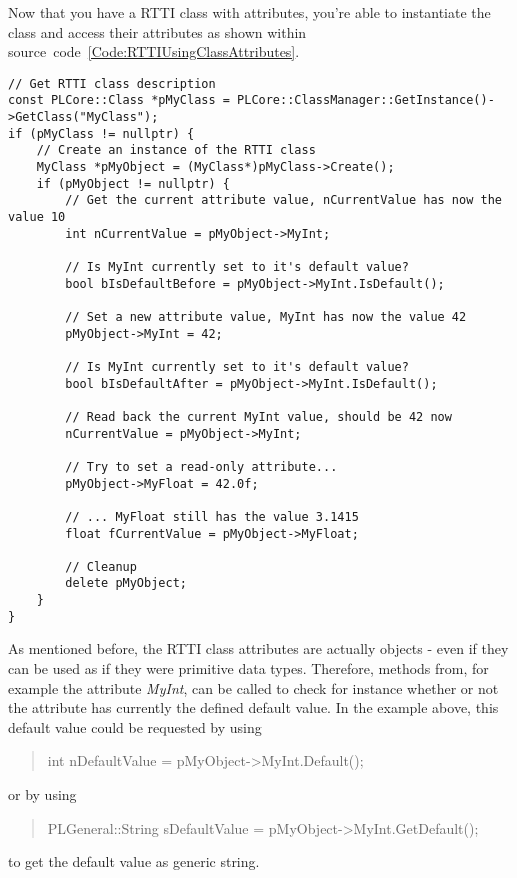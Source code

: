 Now that you have a RTTI class with attributes, you're able to instantiate the class and access their attributes as shown within source~code~\ref{Code:RTTIUsingClassAttributes}.
\begin{lstlisting}[label=Code:RTTIUsingClassAttributes,caption={Using RTTI class attributes}]
// Get RTTI class description
const PLCore::Class *pMyClass = PLCore::ClassManager::GetInstance()->GetClass("MyClass");
if (pMyClass != nullptr) {
	// Create an instance of the RTTI class
	MyClass *pMyObject = (MyClass*)pMyClass->Create();
	if (pMyObject != nullptr) {
		// Get the current attribute value, nCurrentValue has now the value 10
		int nCurrentValue = pMyObject->MyInt;

		// Is MyInt currently set to it's default value?
		bool bIsDefaultBefore = pMyObject->MyInt.IsDefault();

		// Set a new attribute value, MyInt has now the value 42
		pMyObject->MyInt = 42;

		// Is MyInt currently set to it's default value?
		bool bIsDefaultAfter = pMyObject->MyInt.IsDefault();

		// Read back the current MyInt value, should be 42 now
		nCurrentValue = pMyObject->MyInt;

		// Try to set a read-only attribute...
		pMyObject->MyFloat = 42.0f;

		// ... MyFloat still has the value 3.1415
		float fCurrentValue = pMyObject->MyFloat;

		// Cleanup
		delete pMyObject;
	}
}
\end{lstlisting}
As mentioned before, the RTTI class attributes are actually objects - even if they can be used as if they were primitive data types. Therefore, methods from, for example the attribute \emph{MyInt}, can be called to check for instance whether or not the attribute has currently the defined default value. In the example above, this default value could be requested by using \begin{quote}int nDefaultValue = pMyObject->MyInt.Default();\end{quote} or by using \begin{quote}PLGeneral::String sDefaultValue = pMyObject->MyInt.GetDefault();\end{quote} to get the default value as generic string.

